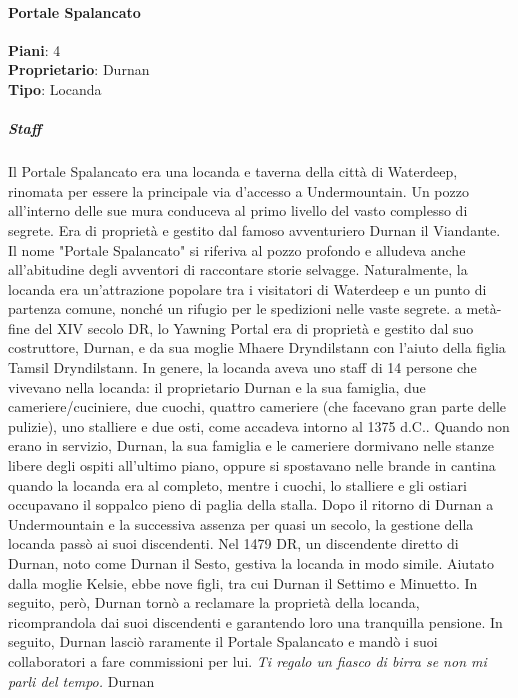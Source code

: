\documentclass{article}
\begin{document}
                  \paragraph{Portale Spalancato}
                  \textbf{Piani}: 4 \\
                  \textbf{Proprietario}: Durnan \\
                  \textbf{Tipo}: Locanda \\
                      \subparagraph{Staff}
                    Il Portale Spalancato era una locanda e taverna della città di Waterdeep, rinomata per essere la principale via d'accesso a Undermountain. Un pozzo all'interno delle sue mura conduceva al primo livello del vasto complesso di segrete. Era di proprietà e gestito dal famoso avventuriero Durnan il Viandante. 
                    Il nome "Portale Spalancato" si riferiva al pozzo profondo e alludeva anche all'abitudine degli avventori di raccontare storie selvagge.
                    Naturalmente, la locanda era un'attrazione popolare tra i visitatori di Waterdeep e un punto di partenza comune, nonché un rifugio per le spedizioni nelle vaste segrete.
                    a metà-fine del XIV secolo DR, lo Yawning Portal era di proprietà e gestito dal suo costruttore, Durnan, e da sua moglie Mhaere Dryndilstann con l'aiuto della figlia Tamsil Dryndilstann. In genere, la locanda aveva uno staff di 14 persone che vivevano nella locanda: il proprietario Durnan e la sua famiglia, due cameriere/cuciniere, due cuochi, quattro cameriere (che facevano gran parte delle pulizie), uno stalliere e due osti, come accadeva intorno al 1375 d.C.. Quando non erano in servizio, Durnan, la sua famiglia e le cameriere dormivano nelle stanze libere degli ospiti all'ultimo piano, oppure si spostavano nelle brande in cantina quando la locanda era al completo, mentre i cuochi, lo stalliere e gli ostiari occupavano il soppalco pieno di paglia della stalla.
                    Dopo il ritorno di Durnan a Undermountain e la successiva assenza per quasi un secolo, la gestione della locanda passò ai suoi discendenti. Nel 1479 DR, un discendente diretto di Durnan, noto come Durnan il Sesto, gestiva la locanda in modo simile. Aiutato dalla moglie Kelsie, ebbe nove figli, tra cui Durnan il Settimo e Minuetto. In seguito, però, Durnan tornò a reclamare la proprietà della locanda, ricomprandola dai suoi discendenti e garantendo loro una tranquilla pensione. In seguito, Durnan lasciò raramente il Portale Spalancato e mandò i suoi collaboratori a fare commissioni per lui.
                    \textit{Ti regalo un fiasco di birra se non mi parli del tempo.} Durnan
\end{document}
